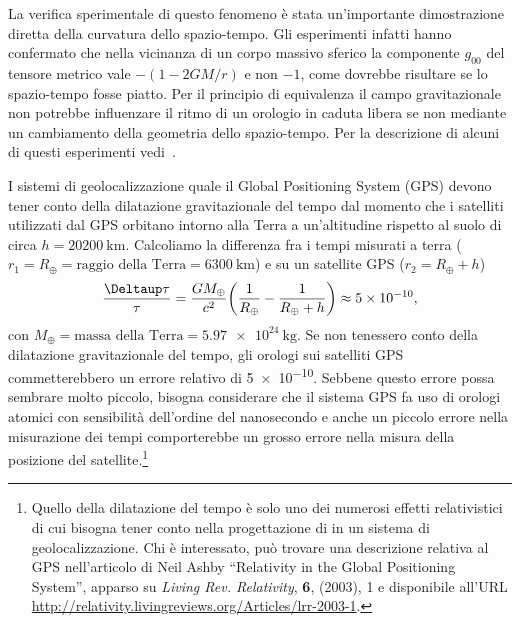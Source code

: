 La verifica sperimentale di questo fenomeno è stata un'importante dimostrazione
diretta della curvatura dello spazio-tempo.  Gli esperimenti infatti hanno
confermato che nella vicinanza di un corpo massivo sferico la componente
$g_{00}$ del tensore metrico vale $-(1-2GM/r)$ e non $-1$, come dovrebbe
risultare se lo spazio-tempo fosse piatto.  Per il principio di equivalenza il
campo gravitazionale non potrebbe influenzare il ritmo di un orologio in caduta
libera se non mediante un cambiamento della geometria dello spazio-tempo.  Per
la descrizione di alcuni di questi esperimenti
vedi~\textcite[157-159]{ohanian:gravitazione}.

I sistemi di geolocalizzazione quale il Global Positioning System (GPS) devono
tener conto della dilatazione gravitazionale del tempo dal momento che i
satelliti utilizzati dal GPS orbitano intorno alla Terra a un'altitudine
rispetto al suolo di circa $h = \SI{20200}{\kilo\metre}$.  Calcoliamo la
differenza fra i tempi misurati a terra
($r_{1} = R_{\oplus} = \text{raggio della Terra} = \SI{6300}{\kilo\metre}$) e su
un satellite GPS ($r_{2} = R_{\oplus} + h$)
\begin{equation}
  \frac{\var \tau}{\tau} = \frac{GM_{\oplus}}{c^{2}} \bigg(\frac{1}{R_{\oplus}}
  - \frac{1}{R_{\oplus} + h}\bigg) \approx \num{5e-10},
\end{equation}
con $M_{\oplus} = \text{massa della Terra} = \SI{5.97e24}{\kilo\gram}$.  Se non
tenessero conto della dilatazione gravitazionale del tempo, gli orologi sui
satelliti GPS commetterebbero un errore relativo di \num{5e-10}.  Sebbene questo
errore possa sembrare molto piccolo, bisogna considerare che il sistema GPS fa
uso di orologi atomici con sensibilità dell'ordine del nanosecondo e anche un
piccolo errore nella misurazione dei tempi comporterebbe un grosso errore nella
misura della posizione del
satellite.\footnote{Quello della dilatazione del tempo è solo uno dei numerosi
  effetti relativistici di cui bisogna tener conto nella progettazione di in un
  sistema di geolocalizzazione.  Chi è interessato, può trovare una descrizione
  relativa al GPS nell'articolo di Neil Ashby ``Relativity in the Global
  Positioning System'', apparso su \emph{Living Rev. Relativity}, \textbf{6},
  (2003), 1 e disponibile all'URL
  \url{http://relativity.livingreviews.org/Articles/lrr-2003-1}.}

